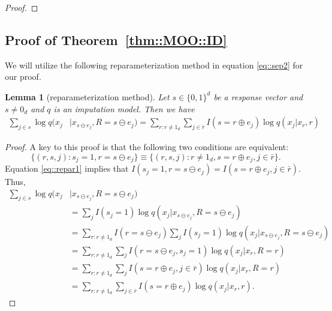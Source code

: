 \documentclass[aos, preprint]{imsart}
\theoremstyle{plain}
\newtheorem{lemma}[theorem]{Lemma}
\theoremstyle{definition}
\begin{document}
\begin{appendix}
\begin{proof}
\end{proof}


\subsection{Proof of Theorem~\ref{thm::MOO::ID}}

We will utilize the following reparameterization method in equation \eqref{eq::sep2} for our proof. 
\begin{lemma}[reparameterization method]
Let $s\in\{0,1\}^d$ be a response vector and $s \neq 0_d$
and $q$ is an imputation model.
Then we have
\begin{align*}
\sum_{j \in s} \log q(x_j &|x_{s\ominus e_j} , R = s\ominus e_j)
=\sum_{r:r\neq 1_d}    \sum_{j \in \bar r} I(s = r\oplus e_j)\log q(x_j |x_{r} , r) 
\end{align*}
\label{lem::repar}
\end{lemma}

\begin{proof}

A key to this proof is that the following two conditions are equivalent:
\begin{equation}
\{(r,s,j): s_j = 1, r=s\ominus e_j\} \equiv \{(r,s,j):r\neq 1_d, s = r\oplus e_j, j \in \bar r\}.
\label{eq::repar1}
\end{equation}
Equation \eqref{eq::repar1} implies that 
$I(s_j=1, r=s\ominus e_j) = I(s = r\oplus e_j, j\in \bar r)$. 
Thus,
\begin{align*}
\sum_{j \in s} \log q(x_j &|x_{s\ominus e_j} , R = s\ominus e_j)\\
& = \sum_{j } I(s_j = 1)\log q(x_j |x_{s\ominus e_j} , R = s\ominus e_j)\\
& = \sum_{r:r\neq 1_d} I(r=s\ominus e_j)\sum_{j } I(s_j = 1)\log q(x_j |x_{s\ominus e_j} , R = s\ominus e_j)\\
& = \sum_{r:r\neq 1_d}\sum_{j} I(r=s\ominus e_j, s_j = 1)\log q(x_j |x_{r} , R = r)\\
& = \sum_{r:r\neq 1_d}\sum_{j} I(s = r\oplus e_j, j\in \bar r)\log q(x_j |x_{r} , R = r)\\
& = \sum_{r:r\neq 1_d}    \sum_{j \in \bar r} I(s = r\oplus e_j)\log q(x_j |x_{r} , r) .
\end{align*}



\end{proof}
\end{appendix}
\end{document}
